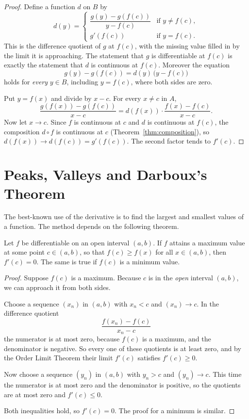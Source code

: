 \begin{proof}
Define a function $d$ on $B$ by
\begin{displaymath}
   d(y) = \left\{
     \begin{array}{ll}
       \dfrac{g(y) - g(f(c))}{y - f(c)} & \text{if } y \neq f(c), \\[2.5ex]
       g'(f(c)) & \text{if } y = f(c).
     \end{array}
   \right.
\end{displaymath}
This is the difference quotient of $g$ at $f(c)$, with the missing value filled in by the limit it is approaching.  The statement that $g$ is differentiable at $f(c)$ is exactly the statement that $d$ is continuous at $f(c)$.  Moreover the equation
\[ g(y) - g(f(c)) = d(y)\,\big(y - f(c)\big) \]
holds for \emph{every} $y \in B$, including $y = f(c)$, where both sides are zero.

Put $y = f(x)$ and divide by $x - c$.  For every $x \neq c$ in $A$,
\[ \frac{g(f(x)) - g(f(c))}{x - c} = d(f(x)) \cdot \frac{f(x) - f(c)}{x - c}. \]
Now let $x \to c$.  Since $f$ is continuous at $c$ and $d$ is continuous at $f(c)$, the composition $d \circ f$ is continuous at $c$ (Theorem~\ref{thm:composition}), so $d(f(x)) \to d(f(c)) = g'(f(c))$.  The second factor tends to $f'(c)$.
\end{proof}

\section{Peaks, Valleys and Darboux's Theorem}

The best-known use of the derivative is to find the largest and smallest values of a function.  The method depends on the following theorem.

\begin{theorem}\label{thm:interior-extremum}
Let $f$ be differentiable on an open interval $(a,b)$.  If $f$ attains a maximum value at some point $c \in (a,b)$, so that $f(c) \geq f(x)$ for all $x \in (a,b)$, then $f'(c) = 0$.  The same is true if $f(c)$ is a minimum value.
\end{theorem}

\begin{proof}
Suppose $f(c)$ is a maximum.  Because $c$ is in the \emph{open} interval $(a,b)$, we can approach it from both sides.

Choose a sequence $(x_n)$ in $(a,b)$ with $x_n < c$ and $(x_n) \to c$.  In the difference quotient
\[ \frac{f(x_n) - f(c)}{x_n - c} \]
the numerator is at most zero, because $f(c)$ is a maximum, and the denominator is negative.  So every one of these quotients is at least zero, and by the Order Limit Theorem their limit $f'(c)$ satisfies $f'(c) \geq 0$.

Now choose a sequence $(y_n)$ in $(a,b)$ with $y_n > c$ and $(y_n) \to c$.  This time the numerator is at most zero and the denominator is positive, so the quotients are at most zero and $f'(c) \leq 0$.

Both inequalities hold, so $f'(c) = 0$.  The proof for a minimum is similar.
\end{proof}

